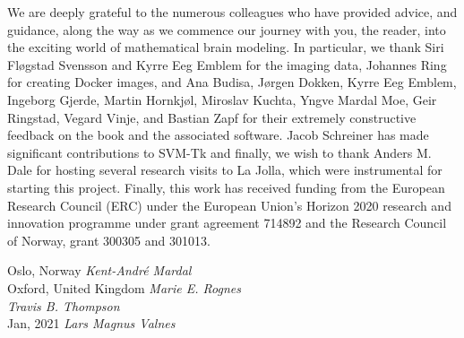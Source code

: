We are deeply grateful to the numerous colleagues who have provided
advice, and guidance, along the way as we commence our journey with
you, the reader, into the exciting world of mathematical brain
modeling. In particular, we thank Siri Fl\o gstad Svensson and Kyrre
Eeg Emblem for the imaging data, Johannes Ring for creating Docker
images, and Ana Budisa, J\o rgen Dokken, Kyrre Eeg Emblem, Ingeborg
Gjerde, Martin Hornkj\o l, Miroslav Kuchta, Yngve Mardal Moe, Geir
Ringstad, Vegard Vinje, and Bastian Zapf for their extremely
constructive feedback on the book and the associated software.  Jacob
Schreiner has made significant contributions to SVM-Tk and finally,
we wish to thank Anders M. Dale for hosting several research
visits to La Jolla, which were instrumental for starting this project.
Finally, this work has received funding from the European Research 
Council (ERC) under the European Union's Horizon 2020 research and 
innovation programme under grant agreement 714892 
and the Research Council of Norway, grant 300305 and 301013. 


\vspace{\baselineskip}
\begin{flushright}\noindent
Oslo, Norway \hfill {\it Kent-Andr\'e Mardal}\\ 
Oxford, United Kingdom   \hfill {\it Marie E. Rognes}\\ 
             \hfill {\it Travis B. Thompson}\\ 
Jan, 2021    \hfill {\it Lars Magnus Valnes}\\ 
\end{flushright}



